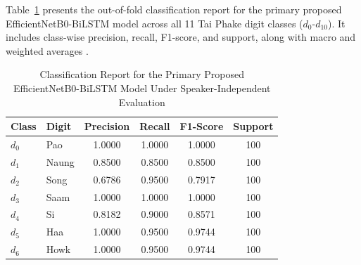 \documentclass[journal]{IEEEtran}
\begin{document}
Table~\ref{tab:classification_report} presents the out-of-fold classification report for the primary proposed EfficientNetB0-BiLSTM model across all 11 Tai Phake digit classes ($d_0$-$d_{10}$). It includes class-wise precision, recall, F1-score, and support, along with macro and weighted averages \cite{sokolova2009systematic,nemani2023speakerindependent}.

\begin{table}[!htbp]
    \centering
    \caption{Classification Report for the Primary Proposed EfficientNetB0-BiLSTM Model Under Speaker-Independent Evaluation \cite{sokolova2009systematic,nemani2023speakerindependent}}
    \label{tab:classification_report}
    \footnotesize
    \setlength{\tabcolsep}{3.8pt}
    \renewcommand{\arraystretch}{1.10}
    \begin{tabular}{llcccc}
        \hline
        \textbf{Class}                                & \textbf{Digit}                                  & \textbf{Precision} & \textbf{Recall} & \textbf{F1-Score} & \textbf{Support} \\
        \hline
        $d_0$                                         & Pao                                             & 1.0000             & 1.0000          & 1.0000            & 100              \\
        $d_1$                                         & Naung                                           & 0.8500             & 0.8500          & 0.8500            & 100              \\
        $d_2$                                         & Song                                            & 0.6786             & 0.9500          & 0.7917            & 100              \\
        $d_3$                                         & Saam                                            & 1.0000             & 1.0000          & 1.0000            & 100              \\
        $d_4$                                         & Si                                              & 0.8182             & 0.9000          & 0.8571            & 100              \\
        $d_5$                                         & Haa                                             & 1.0000             & 0.9500          & 0.9744            & 100              \\
        $d_6$                                         & Howk                                            & 1.0000             & 0.9500          & 0.9744            & 100              \\

\end{tabular}
\end{table}
\end{document}

